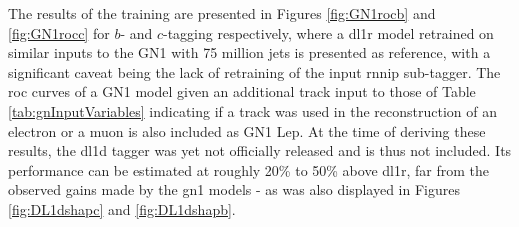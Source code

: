 The results of the training are presented in Figures \ref{fig:GN1rocb} and \ref{fig:GN1rocc} for $b$- and $c$-tagging respectively, where a \gls{dl1r} model retrained on similar inputs to the GN1 with 75 million jets is presented as reference, with a significant caveat being the lack of retraining of the input \gls{rnnip} sub-tagger. The \gls{roc} curves of a GN1 model given an additional track input to those of Table \ref{tab:gnInputVariables} indicating if a track was used in the reconstruction of an electron or a muon is also included as GN1 Lep. At the time of deriving these results, the \gls{dl1d} tagger was yet not officially released and is thus not included. Its performance can be estimated at roughly 20\% to 50\% above \gls{dl1r}, far from the observed gains made by the \gls{gn1} models - as was also displayed in Figures \ref{fig:DL1dshapc} and \ref{fig:DL1dshapb}. 

